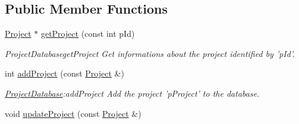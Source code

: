 \subsection*{Public Member Functions}
\begin{DoxyCompactItemize}
\item 
\hyperlink{classProject}{Project} $\ast$ \hyperlink{classProjectDatabase_a895c03003dc4deea0bc429776337795f}{get\+Project} (const int p\+Id)
\begin{DoxyCompactList}\small\item\em Project\+Databaseget\+Project Get informations about the project identified by 'p\+Id'. \end{DoxyCompactList}\item 
int \hyperlink{classProjectDatabase_a3e2c3d198f7f5724ae0388fd49f4e8cb}{add\+Project} (const \hyperlink{classProject}{Project} \&)
\begin{DoxyCompactList}\small\item\em \hyperlink{classProjectDatabase}{Project\+Database}\+:add\+Project Add the project 'p\+Project' to the database. \end{DoxyCompactList}\item 
\hypertarget{classProjectDatabase_a959b2f9617969277a8c92a8239c613f1}{void \hyperlink{classProjectDatabase_a959b2f9617969277a8c92a8239c613f1}{update\+Project} (const \hyperlink{classProject}{Project} \&)}\label{classProjectDatabase_a959b2f9617969277a8c92a8239c613f1}


\end{DoxyCompactItemize}
